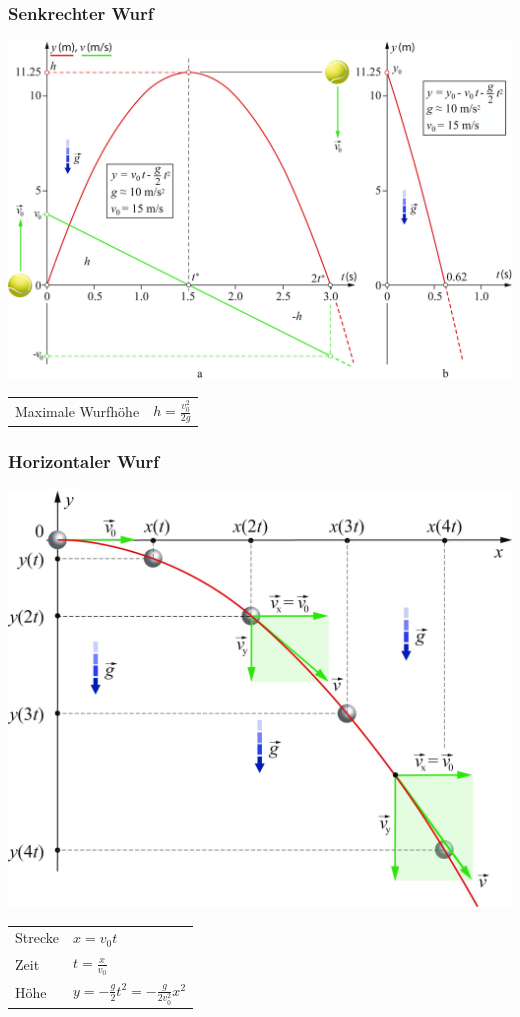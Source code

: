 \documentclass[a4paper]{scrartcl}
\begin{document}
\subsubsection{Senkrechter Wurf}
	\begin{multicols}{2}
		\includegraphics[width=\linewidth]{img/wurf_senkrecht}
		
		\begin{tabu} {l X}
			Maximale Wurfhöhe & $h = \frac{v^2_0}{2g}$
		\end{tabu}
	\end{multicols}

\subsubsection{Horizontaler Wurf}
	\begin{multicols}{2}
		\includegraphics[width=\linewidth]{img/wurf_horizontal}
		
		\begin{tabu} {l X}
			Strecke & $x = v_0 t$ \\
			Zeit & $t = \frac{x}{v_0}$ \\
			Höhe & $y = - \frac{g}{2}t^2 = - \frac{g}{2v^2_0} x^2$
		\end{tabu}
	\end{multicols}
\end{document}
